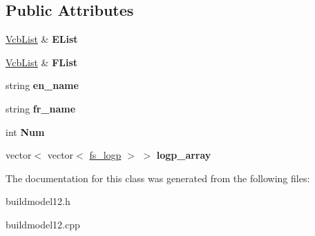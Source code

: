 \subsection*{\-Public \-Attributes}
\begin{DoxyCompactItemize}
\item 
\hypertarget{classbuildmodel12_ab7b8a03130d3f20f3124f41be4429952}{\hyperlink{classVcbList}{\-Vcb\-List} \& {\bfseries \-E\-List}}\label{classbuildmodel12_ab7b8a03130d3f20f3124f41be4429952}

\item 
\hypertarget{classbuildmodel12_ac7326e911bc4aae53266bad52951e11a}{\hyperlink{classVcbList}{\-Vcb\-List} \& {\bfseries \-F\-List}}\label{classbuildmodel12_ac7326e911bc4aae53266bad52951e11a}

\item 
\hypertarget{classbuildmodel12_aed5777b161baac978df81369d00b3d05}{string {\bfseries en\-\_\-name}}\label{classbuildmodel12_aed5777b161baac978df81369d00b3d05}

\item 
\hypertarget{classbuildmodel12_a16486abe966f437dacfb7682a8403e67}{string {\bfseries fr\-\_\-name}}\label{classbuildmodel12_a16486abe966f437dacfb7682a8403e67}

\item 
\hypertarget{classbuildmodel12_a54ed6cb1e76e4b16b2ed7241dbc17ef1}{int {\bfseries \-Num}}\label{classbuildmodel12_a54ed6cb1e76e4b16b2ed7241dbc17ef1}

\item 
\hypertarget{classbuildmodel12_ad39466e3f42159baeb1a329a1cd709e3}{vector$<$ vector$<$ \hyperlink{classfs__logp}{fs\-\_\-logp} $>$ $>$ {\bfseries logp\-\_\-array}}\label{classbuildmodel12_ad39466e3f42159baeb1a329a1cd709e3}

\end{DoxyCompactItemize}


\-The documentation for this class was generated from the following files\-:\begin{DoxyCompactItemize}
\item 
buildmodel12.\-h\item 
buildmodel12.\-cpp\end{DoxyCompactItemize}
